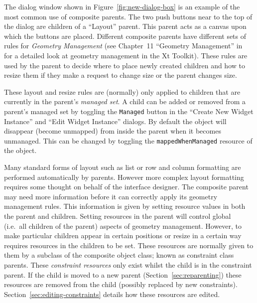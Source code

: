 The dialog window shown in Figure~\ref{fig:new-dialog-box} is an example of
the most common use of composite parents.  The two push buttons near to the
top of the dialog are children of a ``Layout'' parent.  This parent acts as a
canvas upon which the buttons are placed.  Different composite parents have
different sets of rules for {\em Geometry Management} (see Chapter~11
``Geometry Management'' in~\cite{ProgrammingXt} for a detailed look at
geometry management in the Xt Toolkit).  These rules are used by the parent
to decide where to place newly created children and how to resize them if
they make a request to change size or the parent changes size.

These layout and resize rules are (normally) only applied to children
that are currently in the parent's {\em managed set}.  A child can be
added or removed from a parent's managed set by toggling the {\tt Managed}
button in the ``Create New Widget Instance'' and ``Edit Widget Instance''
dialogs.  By default the object will disappear (become unmapped) from
inside the
parent when it becomes unmanaged.  This can be changed by toggling the
{\tt mappedWhenManaged} resource of the object.

Many standard forms of layout such as list or row and column formatting are
performed automatically by parents.  However more complex layout formatting
requires some thought on behalf of the interface designer.  The composite
parent may need more information before it can correctly apply its geometry
management rules.  This information is given by setting resource values in
both the parent and children.  Setting resources in the parent will control
global (i.e.\ all children of the parent) aspects of geometry management.
However, to make particular children appear in certain positions or resize in
a certain way requires resources in the children to be set.  These resources
are normally given to them by a subclass of the composite object class;
known as constraint class parents.  These {\em constraint resources} only
exist whilst the child is in the constraint parent.  If the child is moved to
a new parent (Section~\ref{sec:reparenting}) these resources are removed from
the child (possibly replaced by new constraints).
Section~\ref{sec:editing-constraints} details how these resources are
edited.

